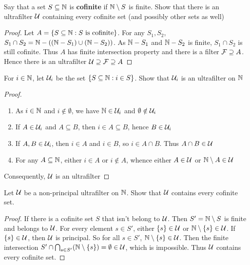 \documentclass[11pt]{article}
\begin{document}
\begin{exercise}[2]
Say that a set \(S\subseteq\mathbb{N}\) is \textbf{cofinite} if \(\mathbb{N}\setminus S\) is finite. Show that there is an ultrafilter \(\mathcal{U}\)
containing every cofinite set (and possibly other sets as well)
\end{exercise}

\begin{proof}
Let \(A=\{S\subseteq\mathbb{N}:S\text{ is cofinite}\}\). For any \(S_1,S_2\), \(S_1\cap S_2=\mathbb{N}-((\mathbb{N}-S_1)\cup(\mathbb{N}-S_2))\). As \(\mathbb{N}-S_1\)
and \(\mathbb{N}-S_2\) is finite, \(S_1\cap S_2\) is still cofinite. Thus \(A\) has finite intersection property
and there is a filter \(\mathcal{F}\supseteq A\). Hence there is an ultrafilter \(\mathcal{U}\supseteq\mathcal{F}\supseteq A\)
\end{proof}


\begin{exercise}
For \(i\in\mathbb{N}\), let \(\mathcal{U}_i\) be the set \(\{S\subseteq\mathbb{N}:i\in S\}\). Show that \(\mathcal{U}_i\) is an ultrafilter on \(\mathbb{N}\)
\end{exercise}

\begin{proof}
\begin{enumerate}
\item As \(i\in\mathbb{N}\) and \(i\notin\emptyset\), we have \(\mathbb{N}\in\mathcal{U}_i\) and \(\emptyset\notin\mathcal{U}_i\)
\item If \(A\in\mathcal{U}_i\) and \(A\subseteq B\), then \(i\in A\subseteq B\), hence \(B\in\mathcal{U}_i\)
\item If \(A,B\in\mathcal{U}_i\), then \(i\in A\) and \(i\in B\), so \(i\in A\cap B\). Thus \(A\cap B\in\mathcal{U}\)
\item For any \(A\subseteq\mathbb{N}\), either \(i\in A\) or \(i\notin A\), whence either \(A\in\mathcal{U}\) or \(\mathbb{N}\setminus A\in\mathcal{U}\)
\end{enumerate}


Consequently, \(\mathcal{U}\) is an ultrafilter
\end{proof}


\begin{exercise}
Let \(\mathcal{U}\) be a non-principal ultrafilter on \(\mathbb{N}\). Show that \(\mathcal{U}\) contains every cofinite set.
\end{exercise}

\begin{proof}
If there is a cofinite set \(S\) that isn't belong to \(\mathcal{U}\). Then \(S'=\mathbb{N}\setminus S\) is finite and belongs
to \(\mathcal{U}\). For every element \(s\in S'\), either \(\{s\}\in\mathcal{U}\) or \(\mathbb{N}\setminus\{s\}\in\mathcal{U}\). If \(\{s\}\in\mathcal{U}\), then \(\mathcal{U}\)
is principal. So for all \(s\in S'\), \(\mathbb{N}\setminus\{s\}\in\mathcal{U}\). Then the finite intersection
\(S'\cap\bigcap_{s\in S'}(\mathbb{N}\setminus\{s\})=\emptyset\in\mathcal{U}\), which is impossible. Thus \(\mathcal{U}\) contains every cofinite set.
\end{proof}
\end{document}
